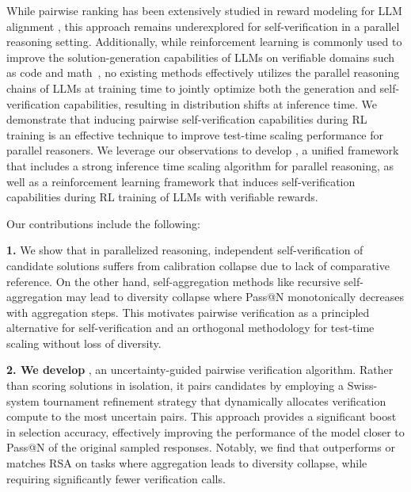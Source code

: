 While pairwise ranking has been extensively studied in reward modeling for LLM alignment \citep{christiano2017rlhf, ziegler2019rlhf}, this approach remains underexplored for self-verification in a parallel reasoning setting. Additionally, while reinforcement learning is commonly used to improve the solution-generation capabilities of LLMs on verifiable domains such as code and math~\citep{shao2024deepseekmathpushinglimitsmathematical, deepseekai2025deepseekr1incentivizingreasoningcapability}, no existing methods effectively utilizes the parallel reasoning chains of LLMs at training time to jointly optimize both the generation and self-verification capabilities, resulting in distribution shifts at inference time.
We demonstrate that inducing pairwise self-verification capabilities during RL training is an effective technique to improve test-time scaling performance for parallel reasoners. We leverage our observations to develop \textbf{\method{}}, a unified framework that includes a strong inference time scaling algorithm for parallel reasoning, as well as a reinforcement learning framework that induces self-verification capabilities during RL training of LLMs with verifiable rewards.

Our contributions include the following:

\textbf{1.} We show that in parallelized reasoning, independent self-verification of candidate solutions suffers from calibration collapse due to lack of comparative reference. On the other hand, self-aggregation methods like recursive self-aggregation \citep[RSA; ][]{venkatraman2025recursiveselfaggregationunlocksdeep} may lead to diversity collapse where Pass@N monotonically decreases with aggregation steps. This motivates pairwise verification as a principled alternative for self-verification and an orthogonal methodology for test-time scaling without loss of diversity.

\textbf{2. We develop \pairinfer{}}, an uncertainty-guided pairwise verification algorithm. Rather than scoring solutions in isolation, it pairs candidates by employing a Swiss-system tournament refinement strategy that dynamically allocates verification compute to the most uncertain pairs. This approach provides a significant boost in selection accuracy, effectively improving the performance of the model closer to Pass@N of the original sampled responses. Notably, we find that \pairinfer{} outperforms or matches RSA on tasks where aggregation leads to diversity collapse, while requiring significantly fewer verification calls.


